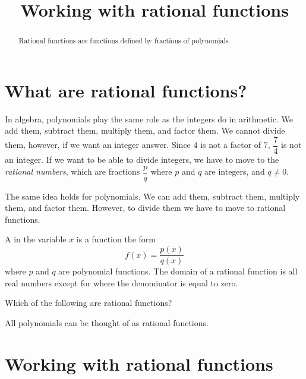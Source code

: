 \documentclass{ximera}
\title[Dig-In:]{Working with rational functions}
\begin{document}
\begin{abstract}
  Rational functions are functions defined by fractions of
  polynomials.
\end{abstract}
\maketitle


\section{What are rational functions?}
In algebra, polynomials play the same role as the integers do in arithmetic.  We add them, subtract them, multiply them, and factor them.  We cannot 
divide them, however, if we want an integer answer.  Since $4$ is not a factor of $7$, $\dfrac{7}{4}$ is not an integer.  If we want to be able to divide
integers, we have to move to the \emph{rational numbers}, which are fractions $\dfrac{p}{q}$ where $p$ and $q$ are integers, and $q \ne 0$.

The same idea holds for polynomials.  We can add them, subtract them, multiply them, and factor them.  However, to divide them we have to move
to rational functions.

\begin{definition}
  A  in the variable $x$ is a function the form
  \[
  f(x) = \frac{p(x)}{q(x)}
  \]
  where $p$ and $q$ are polynomial functions. The domain of a rational
  function is all real numbers except for where the denominator is
  equal to zero.
\end{definition}

\begin{question}
  Which of the following are rational functions?
  \begin{selectAll}
  \end{selectAll}
  \begin{feedback}
    All polynomials can be thought of as rational functions.
  \end{feedback}
\end{question}



\section{Working with rational functions}
\end{document}
